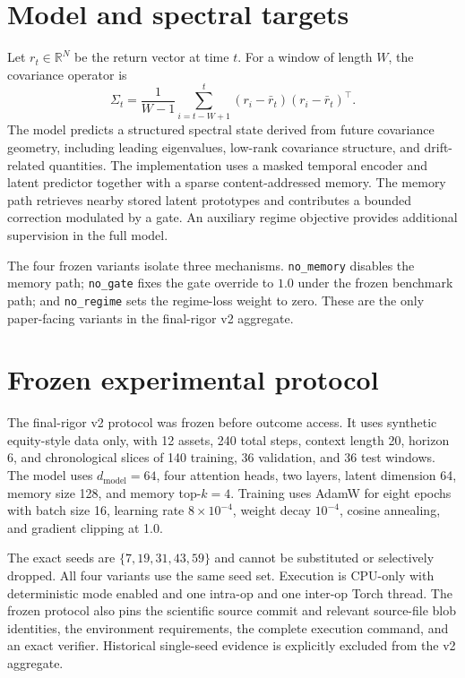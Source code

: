 \documentclass[11pt]{article}
\begin{document}
\section{Model and spectral targets}
Let $r_t\in\mathbb{R}^N$ be the return vector at time $t$. For a window of length $W$, the covariance operator is
\begin{equation}
\Sigma_t=\frac{1}{W-1}\sum_{i=t-W+1}^{t}(r_i-\bar r_t)(r_i-\bar r_t)^\top.
\end{equation}
The model predicts a structured spectral state derived from future covariance geometry, including leading eigenvalues, low-rank covariance structure, and drift-related quantities. The implementation uses a masked temporal encoder and latent predictor together with a sparse content-addressed memory. The memory path retrieves nearby stored latent prototypes and contributes a bounded correction modulated by a gate. An auxiliary regime objective provides additional supervision in the full model.

The four frozen variants isolate three mechanisms. \texttt{no\_memory} disables the memory path; \texttt{no\_gate} fixes the gate override to $1.0$ under the frozen benchmark path; and \texttt{no\_regime} sets the regime-loss weight to zero. These are the only paper-facing variants in the final-rigor v2 aggregate.

\section{Frozen experimental protocol}
The final-rigor v2 protocol was frozen before outcome access. It uses synthetic equity-style data only, with 12 assets, 240 total steps, context length 20, horizon 6, and chronological slices of 140 training, 36 validation, and 36 test windows. The model uses $d_{\mathrm{model}}=64$, four attention heads, two layers, latent dimension 64, memory size 128, and memory top-$k=4$. Training uses AdamW for eight epochs with batch size 16, learning rate $8\times10^{-4}$, weight decay $10^{-4}$, cosine annealing, and gradient clipping at 1.0.

The exact seeds are $\{7,19,31,43,59\}$ and cannot be substituted or selectively dropped. All four variants use the same seed set. Execution is CPU-only with deterministic mode enabled and one intra-op and one inter-op Torch thread. The frozen protocol also pins the scientific source commit and relevant source-file blob identities, the environment requirements, the complete execution command, and an exact verifier. Historical single-seed evidence is explicitly excluded from the v2 aggregate.
\end{document}
